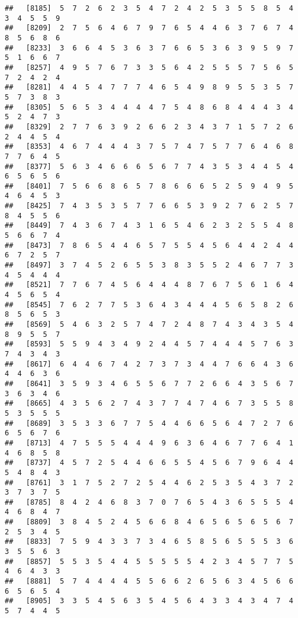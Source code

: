 \documentclass[
]{book}
\begin{document}
\begin{verbatim}
##   [8185]  5  7  2  6  2  3  5  4  7  2  4  2  5  3  5  5  8  5  4  3  4  5  5  9
##   [8209]  2  7  5  6  4  6  7  9  7  6  5  4  4  6  3  7  6  7  4  8  5  6  8  6
##   [8233]  3  6  6  4  5  3  6  3  7  6  6  5  3  6  3  9  5  9  7  5  1  6  6  7
##   [8257]  4  9  5  7  6  7  3  3  5  6  4  2  5  5  5  7  5  6  5  7  2  4  2  4
##   [8281]  4  4  5  4  7  7  7  4  6  5  4  9  8  9  5  5  3  5  7  5  7  3  8  3
##   [8305]  5  6  5  3  4  4  4  4  7  5  4  8  6  8  4  4  4  3  4  5  2  4  7  3
##   [8329]  2  7  7  6  3  9  2  6  6  2  3  4  3  7  1  5  7  2  6  2  4  4  5  4
##   [8353]  4  6  7  4  4  4  3  7  5  7  4  7  5  7  7  6  4  6  8  7  7  6  4  5
##   [8377]  5  6  3  4  6  6  6  5  6  7  7  4  3  5  3  4  4  5  4  6  5  6  5  6
##   [8401]  7  5  6  6  8  6  5  7  8  6  6  6  5  2  5  9  4  9  5  4  6  4  5  3
##   [8425]  7  4  3  5  3  5  7  7  6  6  5  3  9  2  7  6  2  5  7  8  4  5  5  6
##   [8449]  7  4  3  6  7  4  3  1  6  5  4  6  2  3  2  5  5  4  8  5  6  6  7  4
##   [8473]  7  8  6  5  4  4  6  5  7  5  5  4  5  6  4  4  2  4  4  6  7  2  5  7
##   [8497]  3  7  4  5  2  6  5  5  3  8  3  5  5  2  4  6  7  7  3  4  5  4  4  4
##   [8521]  7  7  6  7  4  5  6  4  4  4  8  7  6  7  5  6  1  6  4  4  5  6  5  4
##   [8545]  7  6  2  7  7  5  3  6  4  3  4  4  4  5  6  5  8  2  6  8  5  6  5  3
##   [8569]  5  4  6  3  2  5  7  4  7  2  4  8  7  4  3  4  3  5  4  8  9  5  5  7
##   [8593]  5  5  9  4  3  4  9  2  4  4  5  7  4  4  4  5  7  6  3  7  4  3  4  3
##   [8617]  6  4  4  6  7  4  2  7  3  7  3  4  4  7  6  6  4  3  6  4  4  6  3  6
##   [8641]  3  5  9  3  4  6  5  5  6  7  7  2  6  6  4  3  5  6  7  3  6  3  4  6
##   [8665]  4  3  5  6  2  7  4  3  7  7  4  7  4  6  7  3  5  5  8  5  3  5  5  5
##   [8689]  3  5  3  3  6  7  7  5  4  4  6  6  5  6  4  7  2  7  6  6  5  6  7  6
##   [8713]  4  7  5  5  5  4  4  4  9  6  3  6  4  6  7  7  6  4  1  4  6  8  5  8
##   [8737]  4  5  7  2  5  4  4  6  6  5  5  4  5  6  7  9  6  4  4  5  4  8  4  3
##   [8761]  3  1  7  5  2  7  2  5  4  4  6  2  5  3  5  4  3  7  2  3  7  3  7  5
##   [8785]  8  4  2  4  6  8  3  7  0  7  6  5  4  3  6  5  5  5  4  4  6  8  4  7
##   [8809]  3  8  4  5  2  4  5  6  6  8  4  6  5  6  5  6  5  6  7  2  5  3  4  5
##   [8833]  7  5  9  4  3  3  7  3  4  6  5  8  5  6  5  5  5  3  6  3  5  5  6  3
##   [8857]  5  5  3  5  4  4  5  5  5  5  5  4  2  3  4  5  7  7  5  4  6  4  3  3
##   [8881]  5  7  4  4  4  4  5  5  6  6  2  6  5  6  3  4  5  6  6  6  5  6  5  4
##   [8905]  3  3  5  4  5  6  3  5  4  5  6  4  3  3  4  3  4  7  4  5  7  4  4  5

\end{verbatim}
\end{document}
